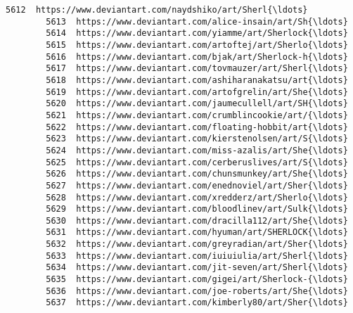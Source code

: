 \documentclass[11pt]{article}
\begin{document}
\begin{Verbatim}[commandchars=\\\{\}]
        5612  https://www.deviantart.com/naydshiko/art/Sherl{\ldots}   
        5613  https://www.deviantart.com/alice-insain/art/Sh{\ldots}   
        5614  https://www.deviantart.com/yiamme/art/Sherlock{\ldots}   
        5615  https://www.deviantart.com/artoftej/art/Sherlo{\ldots}   
        5616  https://www.deviantart.com/bjak/art/Sherlock-h{\ldots}   
        5617  https://www.deviantart.com/tovmauzer/art/Sherl{\ldots}   
        5618  https://www.deviantart.com/ashiharanakatsu/art{\ldots}   
        5619  https://www.deviantart.com/artofgrelin/art/She{\ldots}   
        5620  https://www.deviantart.com/jaumecullell/art/SH{\ldots}   
        5621  https://www.deviantart.com/crumblincookie/art/{\ldots}   
        5622  https://www.deviantart.com/floating-hobbit/art{\ldots}   
        5623  https://www.deviantart.com/kierstenolsen/art/S{\ldots}   
        5624  https://www.deviantart.com/miss-azalis/art/She{\ldots}   
        5625  https://www.deviantart.com/cerberuslives/art/S{\ldots}   
        5626  https://www.deviantart.com/chunsmunkey/art/She{\ldots}   
        5627  https://www.deviantart.com/enednoviel/art/Sher{\ldots}   
        5628  https://www.deviantart.com/xredderz/art/Sherlo{\ldots}   
        5629  https://www.deviantart.com/bloodlinev/art/Sulk{\ldots}   
        5630  https://www.deviantart.com/dracilla112/art/She{\ldots}   
        5631  https://www.deviantart.com/hyuman/art/SHERLOCK{\ldots}   
        5632  https://www.deviantart.com/greyradian/art/Sher{\ldots}   
        5633  https://www.deviantart.com/iuiuiulia/art/Sherl{\ldots}   
        5634  https://www.deviantart.com/jit-seven/art/Sherl{\ldots}   
        5635  https://www.deviantart.com/gigei/art/Sherlock-{\ldots}   
        5636  https://www.deviantart.com/joe-roberts/art/She{\ldots}   
        5637  https://www.deviantart.com/kimberly80/art/Sher{\ldots}   
        

\end{Verbatim}
\end{document}
